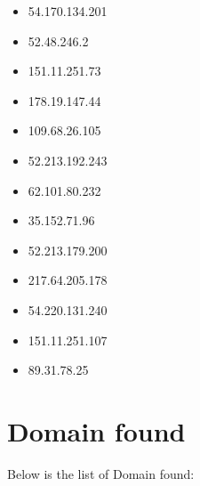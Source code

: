 \documentclass{article}
\begin{document}
\begin{itemize}
        \item 54.170.134.201
    
        \item 52.48.246.2
    
        \item 151.11.251.73
    
        \item 178.19.147.44
    
        \item 109.68.26.105
    
        \item 52.213.192.243
    
        \item 62.101.80.232
    
        \item 35.152.71.96
    
        \item 52.213.179.200
    
        \item 217.64.205.178
    
        \item 54.220.131.240
    
        \item 151.11.251.107
    
        \item 89.31.78.25
    
\end{itemize}


\section*{Domain found}

Below is the list of Domain found:
\end{document}
